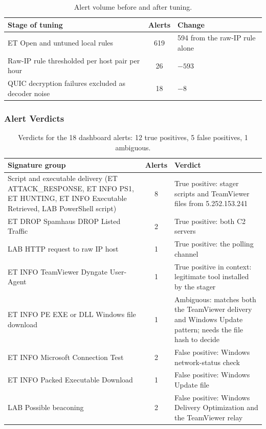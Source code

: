 \begin{table}[htbp]
  \centering
  \caption{Alert volume before and after tuning.}
  \label{tab:alert-volume}
  \footnotesize
  \begin{tabularx}{\linewidth}{@{}YcY@{}}
    \toprule
    \textbf{Stage of tuning} & \textbf{Alerts} & \textbf{Change} \\
    \midrule
    ET Open and untuned local rules & 619 & 594 from the raw-IP rule alone \\
    Raw-IP rule thresholded per host pair per hour & 26 & $-593$ \\
    QUIC decryption failures excluded as decoder noise & 18 & $-8$ \\
    \bottomrule
  \end{tabularx}
\end{table}

\subsubsection{Alert Verdicts}

\begin{table}[htbp]
  \centering
  \caption{Verdicts for the 18 dashboard alerts: 12 true positives, 5 false positives, 1 ambiguous.}
  \label{tab:verdicts}
  \scriptsize
  \setlength{\tabcolsep}{3pt}
  \begin{tabularx}{\linewidth}{@{}YcY@{}}
    \toprule
    \textbf{Signature group} & \textbf{Alerts} & \textbf{Verdict} \\
    \midrule
    Script and executable delivery (ET ATTACK\_RESPONSE, ET INFO PS1, ET HUNTING, ET INFO Executable Retrieved, LAB PowerShell script)
      & 8
      & True positive: stager scripts and TeamViewer files from 5.252.153.241 \\
    ET DROP Spamhaus DROP Listed Traffic
      & 2
      & True positive: both C2 servers \\
    LAB HTTP request to raw IP host
      & 1
      & True positive: the polling channel \\
    ET INFO TeamViewer Dyngate User-Agent
      & 1
      & True positive in context: legitimate tool installed by the stager \\
    ET INFO PE EXE or DLL Windows file download
      & 1
      & Ambiguous: matches both the TeamViewer delivery and Windows Update pattern; needs the file hash to decide \\
    ET INFO Microsoft Connection Test
      & 2
      & False positive: Windows network-status check \\
    ET INFO Packed Executable Download
      & 1
      & False positive: Windows Update file \\
    LAB Possible beaconing
      & 2
      & False positive: Windows Delivery Optimization and the TeamViewer relay \\
    \bottomrule
  \end{tabularx}
\end{table}

